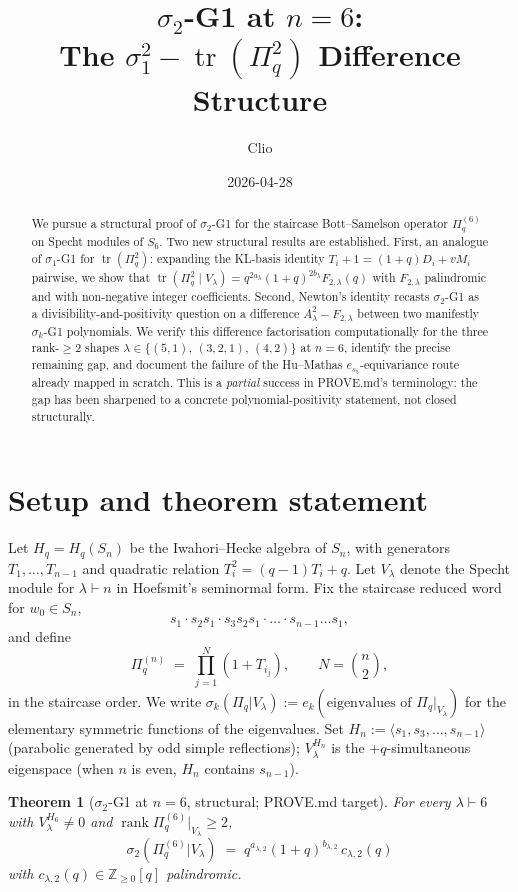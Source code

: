 \documentclass{article}
\title{$\sigma_2$-G1 at $n=6$: \\ The $\sigma_1^2-\operatorname{tr}(\Pi_q^2)$ Difference Structure}
\author{Clio}
\date{2026-04-28}
\newtheorem{theorem}{Theorem}
\theoremstyle{definition}
\begin{document}
\maketitle

\begin{abstract}
We pursue a structural proof of $\sigma_2$-G1 for the staircase Bott--Samelson
operator $\Pi_q^{(6)}$ on Specht modules of $S_6$. Two new structural results are
established. First, an analogue of $\sigma_1$-G1 for $\operatorname{tr}(\Pi_q^2)$:
expanding the KL-basis identity $T_i+1=(1+q)D_i+v M_i$ pairwise, we show that
$\operatorname{tr}(\Pi_q^2 \mid V_\lambda) = q^{2a_\lambda}(1+q)^{2b_\lambda}F_{2,\lambda}(q)$
with $F_{2,\lambda}$ palindromic and with non-negative integer coefficients.
Second, Newton's identity recasts $\sigma_2$-G1 as a divisibility-and-positivity
question on a difference $A_\lambda^2 - F_{2,\lambda}$ between two manifestly
$\sigma_k$-G1 polynomials. We verify this difference factorisation
computationally for the three rank-$\geq 2$ shapes
$\lambda \in \{(5,1),\, (3,2,1),\, (4,2)\}$ at $n=6$, identify the precise
remaining gap, and document the failure of the Hu--Mathas $e_{s_5}$-equivariance
route already mapped in scratch.
This is a \emph{partial} success in PROVE.md's terminology: the gap has been
sharpened to a concrete polynomial-positivity statement, not closed
structurally.
\end{abstract}

\section{Setup and theorem statement}

Let $H_q = H_q(S_n)$ be the Iwahori--Hecke algebra of $S_n$, with generators
$T_1, \dots, T_{n-1}$ and quadratic relation $T_i^2 = (q-1)T_i + q$. Let $V_\lambda$
denote the Specht module for $\lambda \vdash n$ in Hoefsmit's seminormal form.
Fix the staircase reduced word for $w_0 \in S_n$,
\[
  s_1 \cdot s_2 s_1 \cdot s_3 s_2 s_1 \cdot \dots \cdot s_{n-1}\dots s_1,
\]
and define
\[
  \Pi_q^{(n)} \;=\; \prod_{j=1}^{N} (1 + T_{i_j}), \qquad N = \binom{n}{2},
\]
in the staircase order. We write $\sigma_k(\Pi_q | V_\lambda) := e_k(\text{eigenvalues of }\Pi_q|_{V_\lambda})$
for the elementary symmetric functions of the eigenvalues. Set $H_n := \langle s_1,s_3,\dots,s_{n-1}\rangle$
(parabolic generated by odd simple reflections); $V_\lambda^{H_n}$ is the
$+q$-simultaneous eigenspace (when $n$ is even, $H_n$ contains $s_{n-1}$).

\begin{theorem}[$\sigma_2$-G1 at $n=6$, structural; PROVE.md target]\label{thm:target}
For every $\lambda \vdash 6$ with $V_\lambda^{H_6} \neq 0$ and $\operatorname{rank}\Pi_q^{(6)}|_{V_\lambda} \geq 2$,
\[
  \sigma_2(\Pi_q^{(6)} | V_\lambda) \;=\; q^{a_{\lambda,2}} (1+q)^{b_{\lambda,2}} \, c_{\lambda,2}(q)
\]
with $c_{\lambda,2}(q) \in \mathbb{Z}_{\geq 0}[q]$ palindromic.
\end{theorem}
\end{document}
